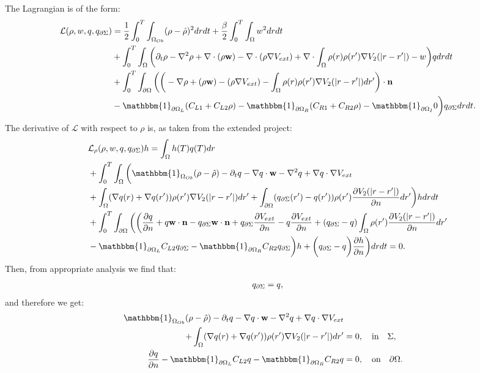 The Lagrangian is of the form:
\begin{align*}
\mathcal{L}(\Sta,w,\Adjb,\Adjc ) &=\frac{1}{2} \int_0^T \int_{\Omega_{Ob}} (\Sta - \hat \Sta)^2 dr dt + \frac{\beta}{2}\int_0^T \int_\Omega w^2 drdt \\
&+ \int_0^T \int_\Omega \bigg( \partial_t \rho - \nabla^2 \rho + \nabla \cdot (\rho \mathbf{w}) -\nabla \cdot (\rho \nabla V_{ext}) + \nabla \cdot \int_\Omega \rho(r) \rho(r') \nabla V_2(|r-r'|) -w \bigg) \Adjb dr dt\\
&+ \int_0^T \int_{\partial \Omega} \bigg(  \bigg(-\nabla \rho+ (\rho \mathbf{w}) -(\rho \nabla V_{ext}) -  \int_\Omega \rho(r) \rho(r') \nabla V_2(|r-r'|) dr' \bigg)\cdot \nor\\
&  -\mathbbm{1}_{\partial \Omega_L}( C_{L1}  + C_{L2}\Sta) -\mathbbm{1}_{\partial \Omega_R} ( C_{R1}  + C_{R2}\Sta) -\mathbbm{1}_{\partial \Omega_I} 0 \bigg) \Adjc dr dt.
\end{align*}
The derivative of $\mathcal{L}$ with respect to $\rho$ is, as taken from the extended project:
\begin{align*}
&\mathcal{L}_\rho (\rho,{w},\Adjb,\Adjc)h=
\int_\Omega h(T) \Adjb(T) dr\\
&+ \int_0^T \int_\Omega \bigg( \mathbbm{1}_{ \Omega_{Ob}} (\rho- \hat{\rho})  - \partial_t \Adjb  - \nabla \Adjb \cdot \mathbf{w}  - \nabla^2 \Adjb \notag 
+  \nabla \Adjb \cdot \nabla V_{ext}  \notag \\
&+ \int_\Omega (\nabla  \Adjb(r)+\nabla  \Adjb(r')) \rho(r') \nabla V_2(|r-r'|) dr'+ \int_{\partial \Omega} ( \Adjc(r') - \Adjb(r')) \rho(r')   \frac{\partial V_2(|r-r'|)}{\partial n} dr' \bigg) h dr dt \\
&+  \int_0^T\int_{\partial \Omega}  \bigg(
\bigg(\frac{\partial \Adjb }{\partial n} + \Adjb  \mathbf{w} \cdot \mathbf{n} - \Adjc \mathbf{w} \cdot \mathbf{n}  +  \Adjc \dfrac{\partial V_{ext}}{\partial n} - \Adjb \frac{\partial V_{ext}}{\partial n} + ( \Adjc - \Adjb)  \int_\Omega \rho(r') \frac{\partial V_2(|r-r'|)}{\partial n} dr'\\
& -\mathbbm{1}_{\partial \Omega_L} C_{L2} \Adjc   -\mathbbm{1}_{\partial \Omega_R} C_{R2} \Adjc \bigg)h + \bigg( \Adjc- \Adjb \bigg) \frac{\partial h}{\partial n} \bigg) dr dt =0.
\end{align*}
Then, from appropriate analysis we find that:
\begin{align*}
{q}_{\partial \Sigma} = q,
\end{align*}
and therefore we get:
\begin{align*}
\mathbbm{1}_{\Omega_{Ob}}(\rho- \hat{\rho})   - \partial_t  \Adjb  - \nabla \Adjb \cdot \mathbf{w}  - \nabla^2 \Adjb \notag 
+  \nabla \Adjb \cdot \nabla V_{ext}  \notag \\
+ \int_\Omega (\nabla  \Adjb(r)+\nabla  \Adjb(r')) \rho(r') \nabla V_2(|r-r'|) dr' &=0, \quad \text{in} \quad \Sigma, \\
\frac{\partial \Adjb }{\partial n}  -\mathbbm{1}_{\partial \Omega_L} C_{L2} \Adjb   -\mathbbm{1}_{\partial \Omega_R} C_{R2} \Adjb&=0, \quad \text{on} \quad \partial \Omega.
\end{align*}
